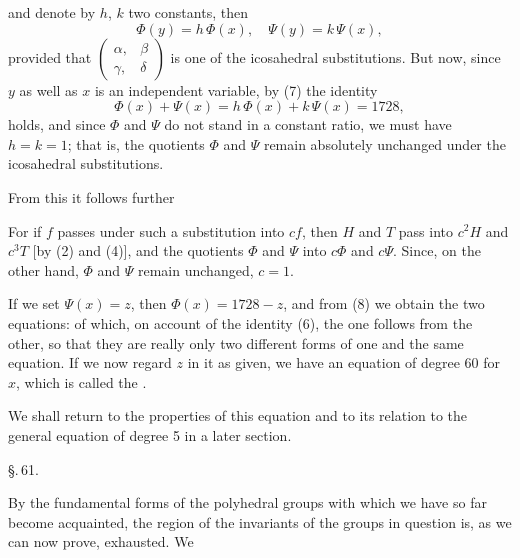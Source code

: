 and denote by $h$, $k$ two constants, then
\[
\Phi(y) = h\,\Phi(x), \quad \Psi(y) = k\,\Psi(x),
\]
provided that $\begin{pmatrix} \alpha, & \beta \\ \gamma, & \delta \end{pmatrix}$ is one of the icosahedral substitutions. But now, since $y$ as well as $x$ is an independent variable, by (7) the identity
\[
\Phi(x) + \Psi(x) = h\,\Phi(x) + k\,\Psi(x) = 1728,
\]
holds, and since $\Phi$ and $\Psi$ do not stand in a constant ratio, we must have $h = k = 1$; that is, the quotients $\Phi$ and $\Psi$ remain absolutely unchanged under the icosahedral substitutions.

From this it follows further 

For if $f$ passes under such a substitution into $cf$, then $H$ and $T$ pass into $c^2H$ and $c^3T$ [by (2) and (4)], and the quotients $\Phi$ and $\Psi$ into $c\Phi$ and $c\Psi$. Since, on the other hand, $\Phi$ and $\Psi$ remain unchanged, $c = 1$.

If we set $\Psi(x) = z$, then $\Phi(x) = 1728 - z$, and from (8) we obtain the two equations:
of which, on account of the identity (6), the one follows from the other, so that they are really only two different forms of one and the same equation. If we now regard $z$ in it as given, we have an equation of degree 60 for $x$, which is called the .

We shall return to the properties of this equation and to its relation to the general equation of degree 5 in a later section.

\begin{center}
\S.\,61.\\[2pt]
\end{center}

By the fundamental forms of the polyhedral groups with which we have so far become acquainted, the region of the invariants of the groups in question is, as we can now prove, exhausted. We
